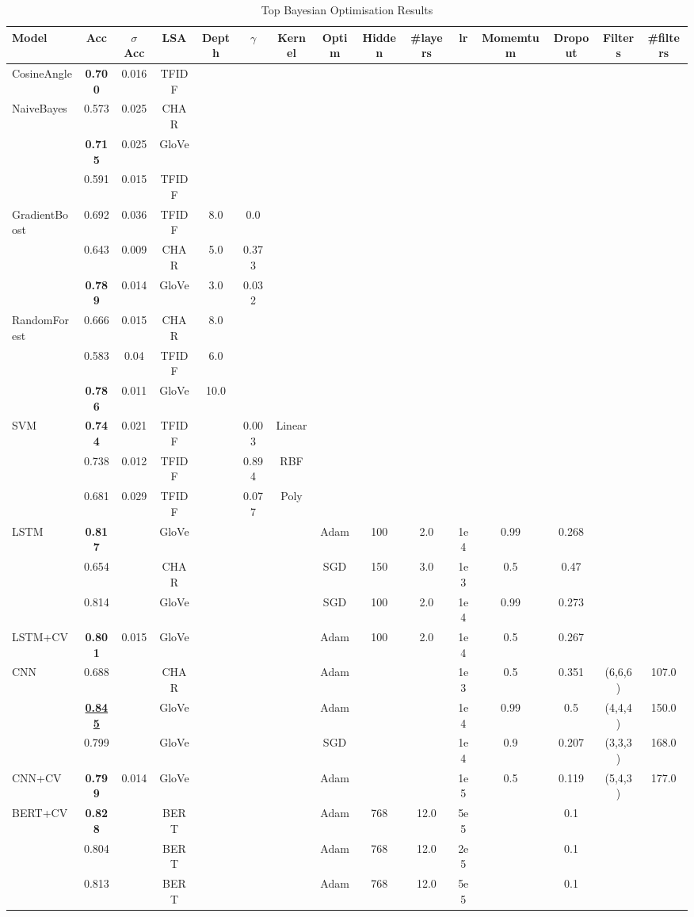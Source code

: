 \documentclass[journal, ]{IEEEtran}
\let\MYoriglatexcaption\caption
\renewcommand{\caption}[2][\relax]{\MYoriglatexcaption[#2]{#2}}
\begin{document}
\begin{table}[t]
\centering
\begin{tabular}{|l c c c c c c c c c c c c c c|} 
  \hline
   Model&Acc&$\sigma$ Acc&LSA&Depth&$\gamma$&Kernel&Optim&Hidden&\#layers&lr&Momemtum&Dropout&Filters&\#filters\\
  \hline
  CosineAngle&\textbf{0.700}&0.016&TFIDF&&&&&&&&&&&\\
  \hline
  \multirow{3}{*}{NaiveBayes}&0.573&0.025&CHAR&&&&&&&&&&&\\
  &\textbf{0.715}&0.025&GloVe&&&&&&&&&&&\\
  &0.591&0.015&TFIDF&&&&&&&&&&&\\
  \hline
  \multirow{3}{*}{GradientBoost}&0.692&0.036&TFIDF&8.0&0.0&&&&&&&&&\\
  &0.643&0.009&CHAR&5.0&0.373&&&&&&&&&\\
  &\textbf{0.789}&0.014&GloVe&3.0&0.032&&&&&&&&&\\
  \hline
  \multirow{3}{*}{RandomForest}&0.666&0.015&CHAR&8.0&&&&&&&&&&\\
  &0.583&0.04&TFIDF&6.0&&&&&&&&&&\\
  &\textbf{0.786}&0.011&GloVe&10.0&&&&&&&&&&\\
  \hline
  \multirow{3}{*}{SVM}&\textbf{0.744}&0.021&TFIDF&&0.003&Linear&&&&&&&&\\
  &0.738&0.012&TFIDF&&0.894&RBF&&&&&&&&\\
  &0.681&0.029&TFIDF&&0.077&Poly&&&&&&&&\\
  \hline
  \multirow{3}{*}{LSTM}&{\textbf{0.817}}&&GloVe&&&&Adam&100&2.0&1e4&0.99&0.268&&\\
  &0.654&&CHAR&&&&SGD&150&3.0&1e3&0.5&0.47&&\\
  &0.814&&GloVe&&&&SGD&100&2.0&1e4&0.99&0.273&&\\
  LSTM+CV&\textbf{0.801}&0.015&GloVe&&&&Adam&100&2.0&1e4&0.5&0.267&&\\
  \hline
  \multirow{3}{*}{CNN}&0.688&&CHAR&&&&Adam&&&1e3&0.5&0.351&(6,6,6)&107.0\\
  &\underline{\textbf{0.845}}&&GloVe&&&&Adam&&&1e4&0.99&0.5&(4,4,4)&150.0\\
  &0.799&&GloVe&&&&SGD&&&1e4&0.9&0.207&(3,3,3)&168.0\\
  CNN+CV&\textbf{0.799}&0.014&GloVe&&&&Adam&&&1e5&0.5&0.119&(5,4,3)&177.0\\
  \hline
  \multirow{3}{*}{BERT+CV}&\textbf{0.828}&&BERT&&&&Adam&768&12.0&5e5&&0.1&&\\
  &0.804&&BERT&&&&Adam&768&12.0&2e5&&0.1&&\\
  &0.813&&BERT&&&&Adam&768&12.0&5e5&&0.1&&\\
  \hline
\end{tabular}
\caption{Top Bayesian Optimisation Results}
\label{tab:results}
\end{table}
\end{document}
